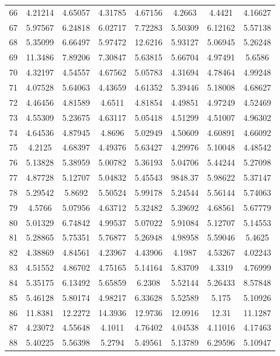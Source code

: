 \begin{center}
\begin{longtable}{cccccccc}
66 & 4.21214 & 4.65057 & 4.31785 & 4.67156 & 4.2663 & 4.4421 & 4.16627\\
67 & 5.97567 & 6.24818 & 6.02717 & 7.72283 & 5.50309 & 6.12162 & 5.57138\\
68 & 5.35099 & 6.66497 & 5.97472 & 12.6216 & 5.93127 & 5.06945 & 5.26248\\
69 & 11.3486 & 7.89206 & 7.30847 & 5.63815 & 5.66704 & 4.97491 & 5.6586\\
70 & 4.32197 & 4.54557 & 4.67562 & 5.05783 & 4.31694 & 4.78464 & 4.99248\\
71 & 4.07528 & 5.64063 & 4.43659 & 4.61352 & 5.39446 & 5.18008 & 4.68627\\
72 & 4.46456 & 4.81589 & 4.6511 & 4.81854 & 4.49851 & 4.97249 & 4.52469\\
73 & 4.55309 & 5.23675 & 4.63117 & 5.05418 & 4.51299 & 4.51007 & 4.96302\\
74 & 4.64536 & 4.87945 & 4.8696 & 5.02949 & 4.50609 & 4.60891 & 4.66092\\
75 & 4.2125 & 4.68397 & 4.49376 & 5.63427 & 4.29976 & 5.10048 & 4.48542\\
76 & 5.13828 & 5.38959 & 5.00782 & 5.36193 & 5.04706 & 5.44244 & 5.27098\\
77 & 4.87728 & 5.12707 & 5.04832 & 5.45543 & 9848.37 & 5.98622 & 5.37147\\
78 & 5.29542 & 5.8692 & 5.50524 & 5.99178 & 5.24544 & 5.56144 & 5.74063\\
79 & 4.5766 & 5.07956 & 4.63712 & 5.32482 & 5.39692 & 4.68561 & 5.67779\\
80 & 5.01329 & 6.74842 & 4.99537 & 5.07022 & 5.91084 & 5.12707 & 5.14553\\
81 & 5.28865 & 5.75351 & 5.76877 & 5.26948 & 4.98958 & 5.59046 & 5.4625\\
82 & 4.38869 & 4.84561 & 4.23967 & 4.43906 & 4.1987 & 4.53267 & 4.02243\\
83 & 4.51552 & 4.86702 & 4.75165 & 5.14164 & 5.83709 & 4.3319 & 4.76999\\
84 & 5.35175 & 6.13492 & 5.65859 & 6.2308 & 5.52144 & 5.26433 & 8.57848\\
85 & 5.46128 & 5.80174 & 4.98217 & 6.33628 & 5.52589 & 5.175 & 5.10926\\
86 & 11.8381 & 12.2272 & 14.3936 & 12.9736 & 12.0916 & 12.31 & 11.1287\\
87 & 4.23072 & 4.55648 & 4.1011 & 4.76402 & 4.04538 & 4.11016 & 4.17463\\
88 & 5.40225 & 5.56398 & 5.2794 & 5.49561 & 5.13789 & 6.29596 & 5.10947\\

\end{longtable}
\end{center}
